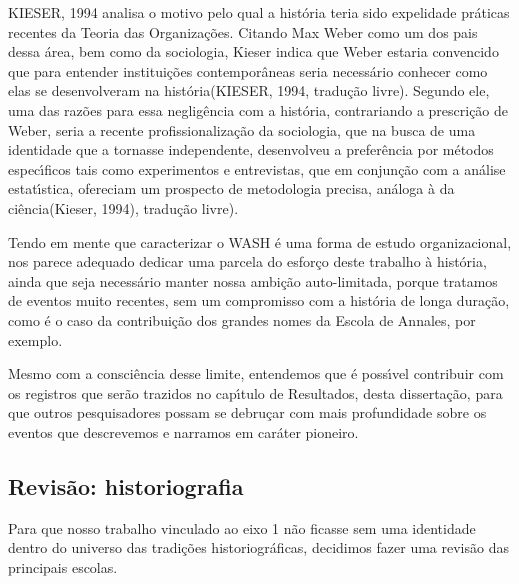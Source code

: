 \documentclass[
12pt,		%
openright,	%
twoside,  %
a4paper,			%
chapter=TITLE,		%
english,			%
french,				%
spanish,			%
brazil				%
]{USPSC-classe/USPSC}
\begin{document}
KIESER, 1994  analisa o motivo pelo qual a hist\'oria teria sido \textquotedbl expelida\textquotedbl  de pr\'aticas recentes da Teoria das Organiza\c{c}\~oes. Citando Max Weber como um dos pais dessa \'area, bem como da sociologia, Kieser indica que Weber estaria \textquotedbl convencido que para entender institui\c{c}\~oes contempor\^aneas seria necess\'ario conhecer como elas se desenvolveram na hist\'oria\textquotedbl   (KIESER, 1994, tradu\c{c}\~ao livre). Segundo ele, uma das raz\~oes para essa neglig\^encia com a hist\'oria, contrariando a prescri\c{c}\~ao de Weber, seria a recente profissionaliza\c{c}\~ao da sociologia, que na busca de uma identidade que a tornasse independente, desenvolveu a prefer\^encia por m\'etodos espec\'{\i}ficos tais como experimentos e entrevistas, que \textquotedbl em conjun\c{c}\~ao com a an\'alise estat\'{\i}stica, ofereciam um prospecto de metodologia precisa, an\'aloga \`a da ci\^encia\textquotedbl  (Kieser, 1994), tradu\c{c}\~ao livre).









Tendo em mente que caracterizar o WASH \'e uma forma de estudo organizacional, nos parece adequado dedicar uma parcela do esfor\c{c}o deste trabalho \`a hist\'oria, ainda que seja necess\'ario manter nossa ambi\c{c}\~ao auto-limitada, porque tratamos de eventos muito recentes, sem um compromisso com a hist\'oria de longa dura\c{c}\~ao, como \'e o caso da contribui\c{c}\~ao dos grandes nomes da Escola de Annales, por exemplo.









Mesmo com a consci\^encia desse limite, entendemos que \'e poss\'{\i}vel contribuir com os registros que ser\~ao trazidos no cap\'{\i}tulo de Resultados, desta disserta\c{c}\~ao, para que outros pesquisadores possam se debru\c{c}ar com mais profundidade sobre os eventos que descrevemos e narramos em car\'ater pioneiro.









\subsection[Revis\~ao: historiografia]{Revis\~ao: historiografia}\label{Revis\~ao: historiografia}
Para que nosso trabalho vinculado ao eixo 1 n\~ao ficasse sem uma identidade dentro do universo das tradi\c{c}\~oes historiogr\'aficas, decidimos fazer uma revis\~ao das principais escolas.
\end{document}
